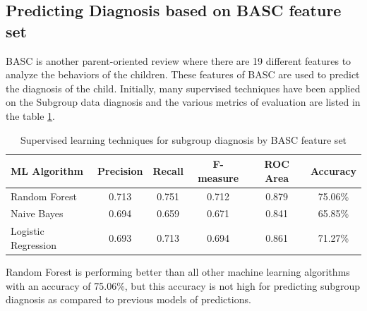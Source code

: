 \subsection{Predicting Diagnosis based on BASC feature set}
BASC is another parent-oriented review where there are 19 different features to analyze the behaviors of the children. These features of BASC are used to predict the diagnosis of the child. Initially, many supervised techniques have been applied on the Subgroup data diagnosis and the various metrics of evaluation are listed in the table \ref{table:46}. 
\begin{table}[h]
\begin{center}
\begin{tabular}{|l|c|c|c|c|c|}
\hline
\textbf{ML Algorithm} &	\textbf{Precision}&	\textbf{Recall}&	\textbf{F-measure}& \textbf{ROC Area}&	\textbf{Accuracy}\\
\hline \hline
Random Forest&0.713	&0.751&	0.712	&0.879&	75.06\%\\
\hline
Naive Bayes&0.694	&0.659&	0.671	&0.841&	65.85\%\\
\hline
Logistic Regression&0.693	&0.713	&0.694&	0.861&	71.27\%\\
\hline
\end{tabular}
\end{center}
\caption{Supervised learning techniques for subgroup diagnosis by BASC feature set}
\label{table:46}
\end{table}

Random Forest is performing better than all other machine learning algorithms with an accuracy of 75.06\%, but this accuracy is not high for predicting subgroup diagnosis as compared to previous models of predictions.

